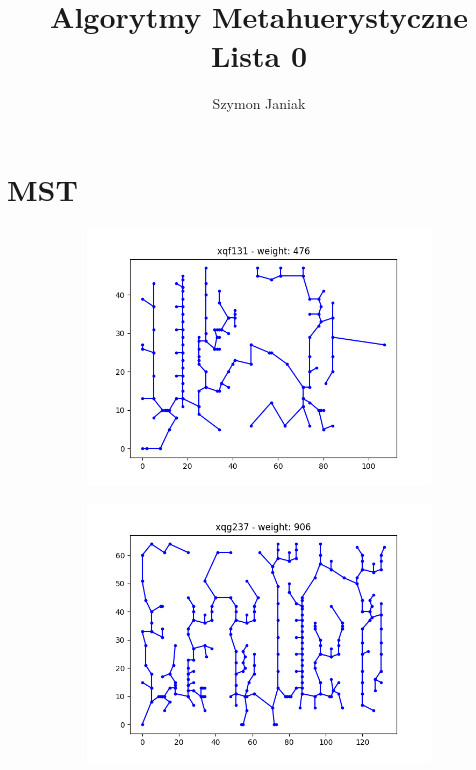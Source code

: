 \documentclass{article}
\title{%
	Algorytmy Metahuerystyczne \\
	\large Lista 0}
\author{Szymon Janiak}
\def\v{0.4}
\begin{document}
\maketitle

\sectionfont{\centering}
\subsectionfont{\centering}
\section{MST}
\begin{figure}[h!]
	\centering
	\begin{subfigure}[b]{\v\linewidth}
		\includegraphics[width=\linewidth]{graphs/MST_xqf131.png}
	\end{subfigure}
	\begin{subfigure}[b]{\v\linewidth}
		\includegraphics[width=\linewidth]{graphs/MST_xqg237.png}

\end{subfigure}
\end{figure}
\end{document}
